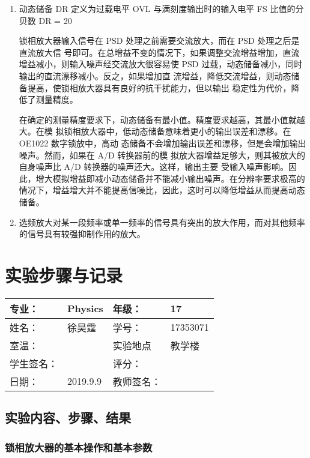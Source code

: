 \documentclass[11pt,a4paper]{ctexart}
\begin{document}
\begin{enumerate}
 \item 动态储备 DR 定义为过载电平 OVL 与满刻度输出时的输入电平 FS 比值的分贝数
 \beq
 DR = 20   
\eeq
\par
锁相放大器输入信号在 PSD 处理之前需要交流放大，而在 PSD 处理之后是直流放大信
号即可。在总增益不变的情况下，如果调整交流增益增加，直流增益减小，则输入噪声经交流放大很容易使 PSD 过载，动态储备减小，同时输出的直流漂移减小。反之，如果增加直
流增益，降低交流增益，则动态储备提高，使锁相放大器具有良好的抗干扰能力，但以输出
稳定性为代价，降低了测量精度。\par
在确定的测量精度要求下，动态储备有最小值。精度要求越高，其最小值就越大。在模
拟锁相放大器中，低动态储备意味着更小的输出误差和漂移。在 OE1022 数字锁放中，高动
态储备不会增加输出误差和漂移，但是会增加输出噪声。然而，如果在 A/D 转换器前的模
拟放大器增益足够大，则其被放大的自身噪声比 A/D 转换器的噪声还大。这样，输出主要
受输入噪声影响。因此，增大模拟增益即减小动态储备并不能减小输出噪声。在分辨率要求极高的情况下，增益增大并不能提高信噪比，因此，这时可以降低增益从而提高动态储备。
\item 
 选频放大对某一段频率或单一频率的信号具有突出的放大作用，而对其他频率的信号具有较强抑制作用的放大。
 \end{enumerate}

\newpage
\section{实验步骤与记录}
\begin{tabular}{|p{8em}|p{8em}|p{8em}|p{8em}|}
	\hline 
	专业：     &Physics       &年级：      & 17     \\
	\hline
	姓名：& 徐昊霆 &学号：&17353071  \\
	\hline
	室温：&                    &实验地点 & 教学楼 \\
	\hline	
	学生签名： & & 评分： & \\
	\hline
	日期： & 2019.9.9 & 教师签名：&  \\
	\hline
\end{tabular}
\subsection{实验内容、步骤、结果}
\subsubsection{锁相放大器的基本操作和基本参数}
\end{document}
